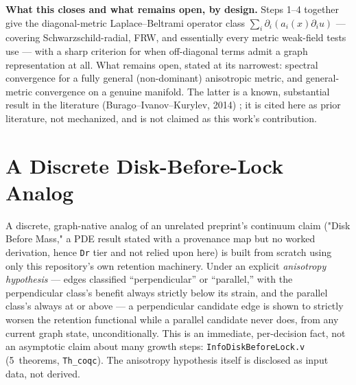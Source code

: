\documentclass[10pt,twocolumn]{article}
\begin{document}
\textbf{What this closes and what remains open, by design.} Steps 1--4 together
give the diagonal-metric Laplace--Beltrami operator class
$\sum_i\partial_i(a_i(x)\partial_i u)$ --- covering Schwarzschild-radial, FRW, and
essentially every metric weak-field tests use --- with a sharp criterion for when
off-diagonal terms admit a graph representation at all. What remains open, stated
at its narrowest: spectral convergence for a fully general (non-dominant)
anisotropic metric, and general-metric convergence on a genuine manifold. The
latter is a known, substantial result in the literature
(Burago--Ivanov--Kurylev, 2014) \cite{bik2014}; it is cited here as prior
literature, not mechanized, and is not claimed as this work's contribution.

\section{A Discrete Disk-Before-Lock Analog}
\label{sec:disklock}
A discrete, graph-native analog of an unrelated preprint's continuum claim
("Disk Before Mass," a PDE result stated with a provenance map but no worked
derivation, hence \texttt{Dr} tier and not relied upon here) is built from
scratch using only this repository's own retention machinery. Under an
explicit \emph{anisotropy hypothesis} --- edges classified ``perpendicular''
or ``parallel,'' with the perpendicular class's benefit always strictly below
its strain, and the parallel class's always at or above --- a perpendicular
candidate edge is shown to strictly worsen the retention functional while a
parallel candidate never does, from any current graph state, unconditionally.
This is an immediate, per-decision fact, not an asymptotic claim about many
growth steps: \texttt{InfoDiskBeforeLock.v} (5~theorems, \texttt{Th\_coqc}).
The anisotropy hypothesis itself is disclosed as input data, not derived.
\end{document}
